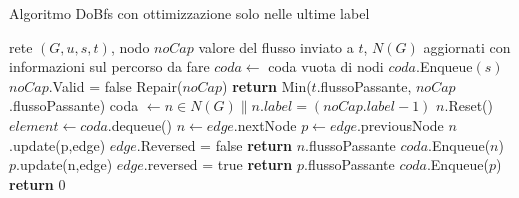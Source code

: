 \documentclass{article}
\begin{document}
\begin{algorithm}
\caption{Algoritmo DoBfs con ottimizzazione solo nelle ultime label}
\begin{algorithmic}
\REQUIRE rete $(G,u,s,t)$, nodo $noCap$
\ENSURE valore del flusso inviato a $t$, $N(G)$ aggiornati con informazioni sul percorso da fare
\STATE $coda \leftarrow$ coda vuota di nodi
\STATE $coda.$Enqueue$(s)$
\ELSE
\STATE $noCap$.Valid = false
\STATE Repair($noCap$)
\STATE \textbf{return} Min($t$.flussoPassante, $noCap$.flussoPassante)
\ENDIF
\STATE coda $\leftarrow n \in N(G) \|  n.label = (noCap.label - 1)$
\STATE $n$.Reset()
\ENDFOR
\ENDIF
{}
\STATE $element  \leftarrow coda$.dequeue()
 
\STATE $n \leftarrow edge.$nextNode
\STATE $p \leftarrow edge$.previousNode
\STATE $n$.update(p,edge) 
\STATE $edge$.Reversed = false 
\STATE \textbf{return} $n$.flussoPassante
\ELSE
\STATE $coda$.Enqueue($n$)
\ENDIF
{}
\STATE $p$.update(n,edge)
\STATE $edge$.reversed = true
\STATE \textbf{return} $p$.flussoPassante
\ELSE
\STATE $coda$.Enqueue($p$)
\ENDIF
\ENDIF
\ENDFOR
\ENDIF
\ENDWHILE
\STATE \textbf{return} 0
\end{algorithmic}
\end{algorithm} 
\end{document}
